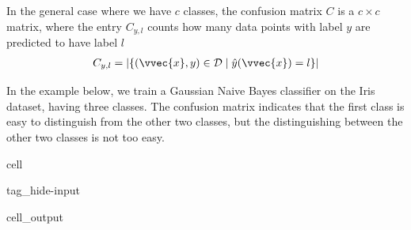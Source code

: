 \documentclass[letterpaper,10pt,english]{jupyterBook}
\begin{document}
\sphinxAtStartPar
In the general case where we have \(c\) classes, the confusion matrix \(C\) is a \(c\times c\) matrix, where the entry \(C_{y,l}\) counts how many data points with label \(y\) are predicted to have label \(l\)
\begin{equation*}
\begin{split}C_{y,l} = \lvert\{(\vvec{x},y)\in\mathcal{D}\mid \hat{y}(\vvec{x})=l\}\rvert \end{split}
\end{equation*}

\sphinxAtStartPar
In the example below, we train a Gaussian Naive Bayes classifier on the Iris dataset, having three classes. The confusion matrix indicates that the first class is easy to distinguish from the other two classes, but the distinguishing between the other two classes is not too easy.

\begin{sphinxuseclass}{cell}
\begin{sphinxuseclass}{tag_hide-input}\begin{sphinxVerbatimOutput}

\begin{sphinxuseclass}{cell_output}
\noindent{}

\end{sphinxuseclass}\end{sphinxVerbatimOutput}

\end{sphinxuseclass}
\end{sphinxuseclass}
\end{document}
